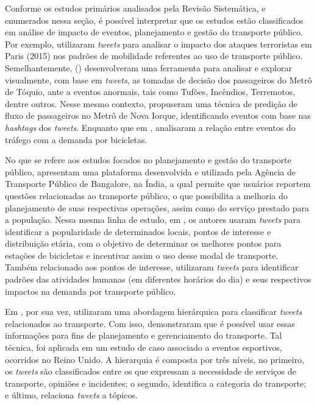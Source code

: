 \documentclass[
	12pt,				%
	oneside,			%
	a4paper,			%
	english,			%
	brazil				%
	]{abntex2ppgsi}
\begin{document}
{{Conforme os estudos primários analisados pela Revisão Sistemática, e enumerados nessa seção, é possível interpretar que os estudos estão classificados em análise de impacto de eventos, planejamento e gestão do transporte público. Por exemplo, \cite{Wen2016} utilizaram \textit{tweets} para analisar o impacto dos ataques terroristas em Paris (2015) nos padrões de mobilidade referentes ao uso de transporte público. Semelhantemente, \citeauthor{Itoh2016} (\citeyear{Itoh2016}) desenvolveram uma ferramenta para analisar e explorar visualmente, com base em \textit{tweets}, as tomadas de decisão dos passageiros do Metrô de Tóquio, ante a eventos anormais, tais como Tufões, Incêndios, Terremotos, dentre outros. Nesse mesmo contexto, \cite{Ni2016} propuseram uma técnica de predição de fluxo de passageiros no Metrô de Nova Iorque, identificando eventos com base nas \textit{hashtags} dos \textit{tweets}. Enquanto que em \cite{Chen2016}, analisaram a relação entre eventos do tráfego com a demanda por bicicletas.

No que se refere aos estudos focados no planejamento e gestão do transporte público, \cite{Mukherjee2015} apresentam uma plataforma desenvolvida e utilizada pela Agência de Transporte Público de Bangalore, na Índia, a qual permite que usuários reportem questões relacionadas ao transporte  público, o que possibilita a melhoria do planejamento de suas respectivas operações, assim como do serviço prestado para a população. Nessa mesma linha de estudo, em \cite{Gutev2016}, os autores usaram \textit{tweets} para identificar a popularidade de determinados locais, pontos de interesse e distribuição etária, com o objetivo de determinar os melhores pontos para estações de bicicletas e incentivar assim o uso desse modal de transporte. Também relacionado aos pontos de interesse, \cite{Maghrebi2015} utilizaram \textit{tweets} para identificar padrões das atividades humanas (em diferentes horários do dia) e seus respectivos impactos na demanda por transporte público.

Em \cite{Gal-Tzur2014}, por sua vez, utilizaram uma abordagem hierárquica para classificar \textit{tweets} relacionados ao transporte. Com isso, demonstraram que é possível usar essas informações para fins de planejamento e gerenciamento do transporte. Tal técnica, foi aplicada em um estudo de caso associado a eventos esportivos, ocorridos no Reino Unido. A hierarquia é composta por três níveis, no primeiro, os \textit{tweets} são classificados entre os que expressam a necessidade de serviços de transporte, opiniões e incidentes; o segundo, identifica a categoria do transporte; e último, relaciona \textit{tweets} a tópicos. 

}}
\end{document}
